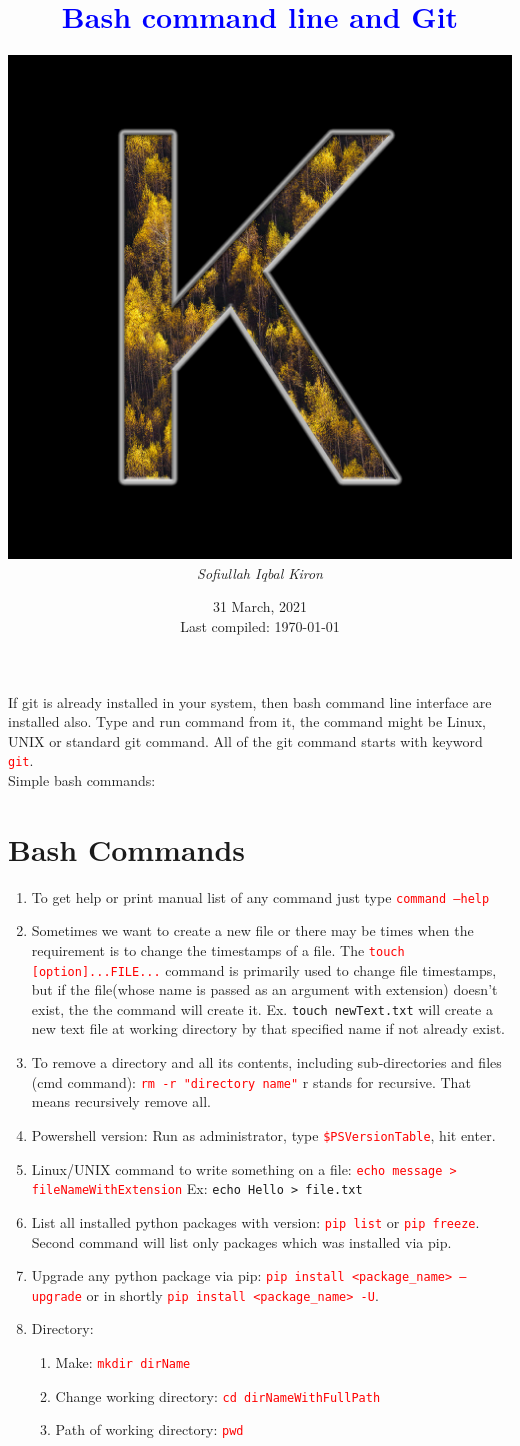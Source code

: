 \documentclass[12 pt, letterpaper]{extarticle}
\title{\textcolor{blue}{Bash command line and Git}}
\author
{
	\includegraphics[scale=0.2]{User Profile.jpg} \\ %
	\textit{Sofiullah Iqbal Kiron} \\
	\R{\rule{11 cm}{2 pt}}
}
\date{31 March, 2021 \\ {\tiny Last compiled: \today}}
\newcommand{\R}{\textcolor{red}} %
\newcommand{\T}{\texttt}
\begin{document}
\maketitle
\justify

If git is already installed in your system, then bash command line interface are installed also. Type and run command from it, the command might be Linux, UNIX or standard git command. All of the git command starts with keyword \R{\T{git}}.\\
Simple bash commands:

\section*{Bash Commands}
\begin{enumerate}
	\item To get help or print manual list of any command just type \R{\T{command --help}}
	\item Sometimes we want to create a new file or there may be times when the requirement is to change the timestamps of a file. The \R{\T{touch [option]...FILE...}} command is primarily used to change file timestamps, but if the file(whose name is passed as an argument with extension) doesn't exist, the the command will create it. Ex. \textcolor{red!70}{\texttt{touch newText.txt}} will create a new text file at working directory by that specified name if not already exist.
	\item To remove a directory and all its contents, including sub-directories and files (cmd command): \R{\T{rm -r "directory name"}} r stands for recursive. That means recursively remove all.
	\item Powershell version: Run as administrator, type \R{\T{\$PSVersionTable}}, hit enter.
	\item Linux/UNIX command to write something on a file: \R{\T{echo message > fileNameWithExtension}} Ex: \textcolor{red!70}{\texttt{echo Hello > file.txt}}
	\item List all installed python packages with version: \R{\T{pip list}} or \R{\T{pip freeze}}. Second command will list only packages which was installed via pip.
	\item Upgrade any python package via pip: \R{\T{pip install <package\_name> --upgrade}} or in shortly \R{\T{pip install <package\_name> -U}}.
	
	\item Directory:
		\begin{enumerate}
			\item Make: \R{\T{mkdir dirName}}
			\item Change working directory: \R{\T{cd dirNameWithFullPath}}
			\item Path of working directory: \R{\T{pwd}}
		\end{enumerate}
	

\end{enumerate}
\end{document}
